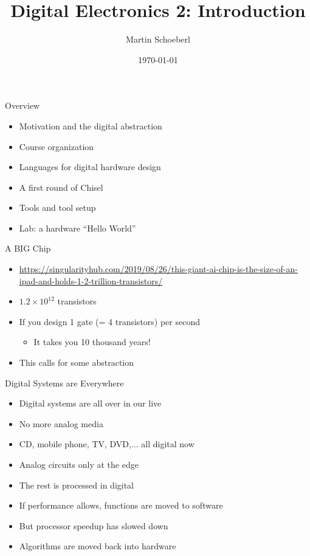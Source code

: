 

\newif\ifbook


\title{Digital Electronics 2: Introduction}
\author{Martin Schoeberl}
\date{\today}



\begin{frame}
\titlepage
\end{frame}


\begin{frame}[fragile]{Overview}
\begin{itemize}
\item Motivation and the digital abstraction
\item Course organization
\item Languages for digital hardware design
\item A first round of Chisel
\item Tools and tool setup
\item Lab: a hardware ``Hello World''
\end{itemize}
\end{frame}




\begin{frame}[fragile]{A BIG Chip}
\begin{itemize}
\item \url{https://singularityhub.com/2019/08/26/this-giant-ai-chip-is-the-size-of-an-ipad-and-holds-1-2-trillion-transistors/}
\item $1.2 \times 10^{12}$ transistors
\item If you design 1 gate (= 4 transistors) per second
\begin{itemize}
\item It takes you 10 thousand years!
\end{itemize}
\item This calls for some abstraction
\end{itemize}
\end{frame}

\begin{frame}[fragile]{Digital Systems are Everywhere}
\begin{itemize}
\item Digital systems are all over in our live
\item No more analog media
\item CD, mobile phone, TV, DVD,... all digital now
\item Analog circuits only at the edge
\item The rest is processed in digital
\item If performance allows, functions are moved to software
\item But processor speedup has slowed down
\item Algorithms are moved back into hardware
\end{itemize}
\end{frame}

